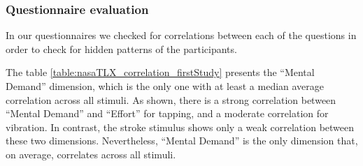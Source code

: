 \subsubsection{Questionnaire evaluation}
In our questionnaires we checked for correlations between each of the questions in order to check for hidden patterns of the participants.

\begin{table}[ht]
\caption{Correlation within the Nasa TLX dimensions.}
\label{table:nasaTLX_correlation_firstStudy}
\end{table}
The table \autoref{table:nasaTLX_correlation_firstStudy} presents the \enquote{Mental Demand} dimension, which is the only one with at least a median average correlation across all stimuli.
As shown, there is a strong correlation between \enquote{Mental Demand} and \enquote{Effort} for tapping, and a moderate correlation for vibration. In contrast, the stroke stimulus shows only a weak correlation between these two dimensions. Nevertheless, \enquote{Mental Demand} is the only dimension that, on average, correlates across all stimuli.


